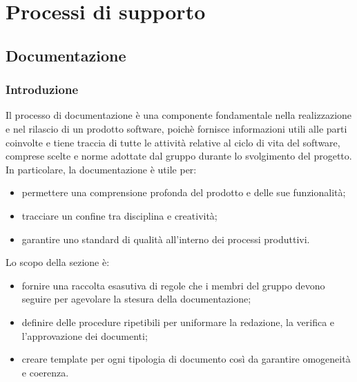\section{Processi di supporto}
\subsection{Documentazione}
\subsubsection{Introduzione}
Il processo di documentazione è una componente fondamentale nella realizzazione e nel rilascio di un prodotto software,
poichè fornisce informazioni utili alle parti coinvolte e tiene traccia di tutte le attività relative al ciclo di vita del software,
comprese scelte e norme adottate dal gruppo durante lo svolgimento del progetto. In particolare, la documentazione è utile per:
\begin{itemize}
	\item permettere una comprensione profonda del prodotto e delle sue funzionalità;
	\item tracciare un confine tra disciplina e creatività;
	\item garantire uno standard di qualità all'interno dei processi produttivi.
\end{itemize}
Lo scopo della sezione è:
\begin{itemize}
	\item fornire una raccolta esasutiva di regole che i membri del gruppo devono seguire per agevolare la stesura della documentazione;
	\item definire delle procedure ripetibili per uniformare la redazione, la verifica e l'approvazione dei documenti;
	\item creare template per ogni tipologia di documento così da garantire omogeneità e coerenza.
\end{itemize}

